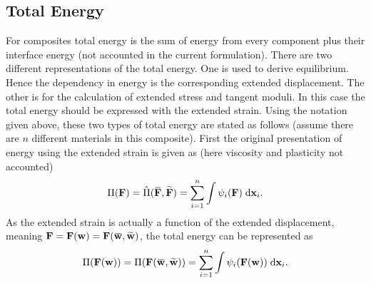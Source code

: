 \documentclass[10pt,a4paper]{scrreprt}
\newcommand{\myd}{\;\mathrm{d}}
\newcommand{\overbar}[1]{\mkern 1.5mu\overline{\mkern-1.5mu#1\mkern-1.5mu}\mkern 1.5mu}
\begin{document}
\subsection{Total Energy}
For composites total energy is the sum of energy from every component plus their interface energy (not accounted in the current formulation). There are two different representations of the total energy. One is used to derive equilibrium. Hence the dependency in energy is the corresponding extended displacement. The other is for the calculation of extended stress and tangent moduli. In this case the total energy should be expressed with the extended strain. Using the notation given above, these two types of total energy are stated as follows (assume there are $n$ different materials in this composite). First the original presentation of energy using the extended strain is given as (here viscosity and plasticity not accounted) 
\begin{equation}
\label{eq: strain energy}
\Pi(\mathbf{F}) = \hat{\Pi}(\overbar{\mathbf{F}}, \widetilde{\mathbf{F}}) = \sum^{n}_{i=1} \int \psi_{i}(\mathbf{F}) \myd{\mathbf{x}_{i}}.
\end{equation}
As the extended strain is actually a function of the extended displacement, meaning $\mathbf{F}=\mathbf{F}(\mathbf{w})=\mathbf{F}(\overbar{\mathbf{w}}, \widetilde{\mathbf{w}})$, the total energy can be represented as
\begin{equation}
\label{eq: disp energy}
\Pi(\mathbf{F}(\mathbf{w})) =\Pi(\mathbf{F}(\overbar{\mathbf{w}}, \widetilde{\mathbf{w}})) =  \sum^{n}_{i=1} \int \psi_{i}(\mathbf{F}(\mathbf{w})) \myd{\mathbf{x}_{i}}.
\end{equation} 
\end{document}
